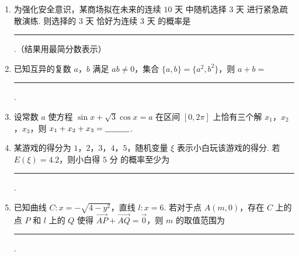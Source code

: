 \begin{description}
\begin{enumerate}[leftmargin=5pt]
        \item 为强化安全意识，某商场拟在未来的连续 \(10\text{ 天}\) 中随机选择 \(3\text{ 天}\) 进行紧急疏散演练. 则选择的 \(3\text{ 天}\) 恰好为连续 \(3\text{ 天}\) 的概率是\rule[-0.3ex]{3em}{0.4pt}.（结果用最简分数表示）

        \item 已知互异的复数 \(a\)，\(b\) 满足 \(ab \neq 0\)，集合 \(\{a, b\} = \{a^2, b^2\}\)，则 \(a + b =\)\rule[-0.3ex]{3em}{0.4pt}.

        \item 设常数 \(a\) 使方程 \(\sin x + \sqrt{3}\cos x = a\) 在区间 \([0, 2\pi]\) 上恰有三个解 \(x_1\)，\(x_2\)，\(x_3\)，则 \(x_1 + x_2 + x_3 =\rule[-0.3ex]{3em}{0.4pt}\).

        \item 某游戏的得分为 \(1\)，\(2\)，\(3\)，\(4\)，\(5\)，随机变量 \(\xi\) 表示小白玩该游戏的得分. 若 \(E(\xi) = 4.2\)，则小白得 \(5\text{ 分}\) 的概率至少为\rule[-0.3ex]{3em}{0.4pt}.

        \item 已知曲线 \(C: x = -\sqrt{4 - y^2}\)，直线 \(l: x = 6\). 若对于点 \(A(m,0)\)，存在 \(C\) 上的点 \(P\) 和 \(l\) 上的 \(Q\) 使得 \(\overrightarrow{AP} + \overrightarrow{AQ} = \overrightarrow{0}\)，则 \(m\) 的取值范围为\rule[-0.3ex]{3em}{0.4pt}.

    \end{enumerate}

\end{description}

